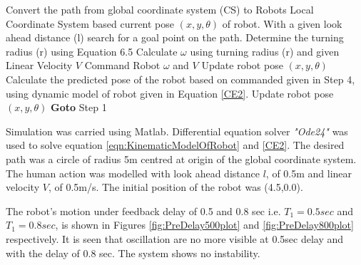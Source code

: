 \begin{algorithmic}[1]
	\State Convert the path from global coordinate system (CS) to Robots Local Coordinate System based current pose  $(x,y,\theta)$ of robot.
	\State With a given look ahead distance (l) search for a goal point on the path.
	\State Determine the turning radius (r) using Equation 6.5 
	\State Calculate $\omega$ using turning radius (r) and given Linear Velocity $V$
	\State Command Robot $\omega$ and  $V$
		\State Update robot pose $(x,y,\theta)$
	\Else
		\State Calculate the predicted pose of the robot  based on commanded given in Step 4, using dynamic model of robot given in Equation \ref{CE2}.
		\State Update robot pose $(x,y,\theta)$ 
	\EndIf
	\State\textbf{ Goto} Step 1
\end{algorithmic}	
 Simulation was carried using Matlab. Differential equation solver \textit{"Ode24"} was used to solve equation \ref{eqn:KinematicModelOfRobot} and \ref{CE2}.  The desired path  was a circle of radius 5m centred at origin of the global coordinate system. The human action was modelled with look ahead distance $l$, of 0.5m and linear velocity $V$, of 0.5m/s. The initial position of the robot was (4.5,0.0).
 
 The  robot's motion  under feedback delay of 0.5 and 0.8 sec i.e.  $T_1=0.5sec$ and $T_1=0.8sec$,  is shown in  Figures \ref{fig:PreDelay500plot} and \ref{fig:PreDelay800plot} respectively.   It is seen that oscillation are no more visible at 0.5sec delay and with the delay of  0.8 sec. The system shows no instability. 

